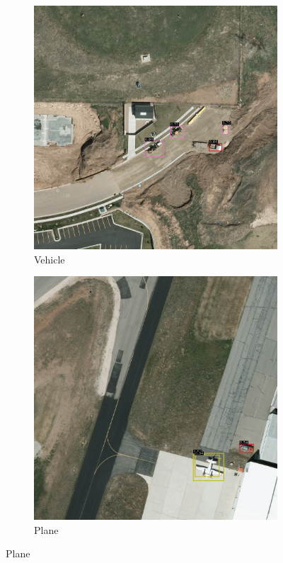 \begin{figure}[h!]
    \begin{subfigure}[t]{0.38\textwidth}
        \centering
        \includegraphics[width=\linewidth]{images/015Results/01abb_vs_obb/comp_images/abb/427.png}
        \caption{Vehicle}
    \end{subfigure}
    \begin{subfigure}[t]{0.38\textwidth}
        \centering
        \includegraphics[width=\linewidth]{images/015Results/01abb_vs_obb/comp_images/abb/487.png}
        \caption{Plane}
    \end{subfigure}
    

\end{figure}
